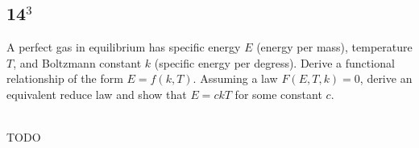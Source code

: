 \documentclass[12pt]{article}
\begin{document}
\subsection{14$^3$}
\begin{Ex}
  A perfect gas in equilibrium has specific energy $E$ (energy per mass),
  temperature $T$, and Boltzmann constant $k$ (specific energy per degress).
  Derive a functional relationship of the form $E=f(k,T)$. Assuming a law
  $F(E,T,k)=0$, derive an equivalent reduce law and show that $E=ckT$ for some
  constant $c$.
  \begin{solution} \hfill \vspace{.75em} \\
    {\huge \color{red}TODO}
  \end{solution}
\end{Ex}
\end{document}
